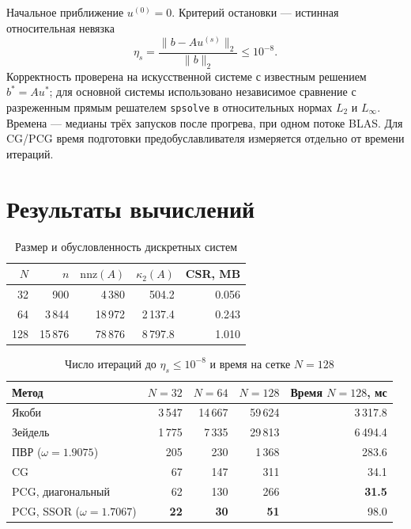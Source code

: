 \documentclass[a4paper,12pt]{article}
\begin{document}
Начальное приближение $u^{(0)}=0$. Критерий остановки --- истинная относительная невязка
\begin{equation}
    \eta_s=\frac{\|b-Au^{(s)}\|_2}{\|b\|_2}\leq10^{-8}.
    \label{eq:residual}
\end{equation}
Корректность проверена на искусственной системе с известным решением $b^*=Au^*$; для основной системы использовано независимое сравнение с разреженным прямым решателем \texttt{spsolve} в относительных нормах $L_2$ и $L_\infty$. Времена --- медианы трёх запусков после прогрева, при одном потоке BLAS. Для CG/PCG время подготовки предобуславливателя измеряется отдельно от времени итераций.

\section{Результаты вычислений}
\begin{table}[H]
    \centering
    \caption{Размер и обусловленность дискретных систем}
    \begin{tabular}{rrrrr}
        \toprule
        $N$ & $n$     & $\mathrm{nnz}(A)$ & $\kappa_2(A)$ & CSR, MB \\
        \midrule
        32  & 900     & 4\,380            & 504.2         & 0.056   \\
        64  & 3\,844  & 18\,972           & 2\,137.4      & 0.243   \\
        128 & 15\,876 & 78\,876           & 8\,797.8      & 1.010   \\
        \bottomrule
    \end{tabular}
\end{table}
\begin{table}[H]
    \centering
    \caption{Число итераций до $\eta_s\leq10^{-8}$ и время на сетке $N=128$}
    \begin{tabular}{lrrrr}
        \toprule
        Метод                       & $N=32$      & $N=64$      & $N=128$     & Время $N=128$, мс \\
        \midrule
        Якоби                       & 3\,547      & 14\,667     & 59\,624     & 3\,317.8          \\
        Зейдель                     & 1\,775      & 7\,335      & 29\,813     & 6\,494.4          \\
        ПВР ($\omega=1.9075$)       & 205         & 230         & 1\,368      & 283.6             \\
        CG                          & 67          & 147         & 311         & 34.1              \\
        PCG, диагональный           & 62          & 130         & 266         & \textbf{31.5}     \\
        PCG, SSOR ($\omega=1.7067$) & \textbf{22} & \textbf{30} & \textbf{51} & 98.0              \\
        \bottomrule
    \end{tabular}
\end{table}
\end{document}
